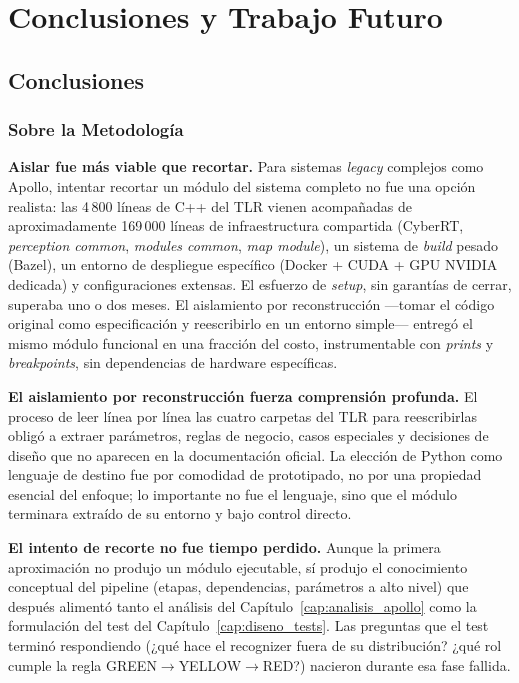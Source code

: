 \chapter{Conclusiones y Trabajo Futuro}
\label{cap:conclusiones}

\section{Conclusiones}

\subsection{Sobre la Metodología}

\textbf{Aislar fue más viable que recortar.} Para sistemas \textit{legacy} complejos como Apollo, intentar recortar un módulo del sistema completo no fue una opción realista: las 4\,800 líneas de C++ del TLR vienen acompañadas de aproximadamente 169\,000 líneas de infraestructura compartida (CyberRT, \textit{perception common}, \textit{modules common}, \textit{map module}), un sistema de \textit{build} pesado (Bazel), un entorno de despliegue específico (Docker + CUDA + GPU NVIDIA dedicada) y configuraciones extensas. El esfuerzo de \textit{setup}, sin garantías de cerrar, superaba uno o dos meses. El aislamiento por reconstrucción ---tomar el código original como especificación y reescribirlo en un entorno simple--- entregó el mismo módulo funcional en una fracción del costo, instrumentable con \textit{prints} y \textit{breakpoints}, sin dependencias de hardware específicas.

\textbf{El aislamiento por reconstrucción fuerza comprensión profunda.} El proceso de leer línea por línea las cuatro carpetas del TLR para reescribirlas obligó a extraer parámetros, reglas de negocio, casos especiales y decisiones de diseño que no aparecen en la documentación oficial. La elección de Python como lenguaje de destino fue por comodidad de prototipado, no por una propiedad esencial del enfoque; lo importante no fue el lenguaje, sino que el módulo terminara extraído de su entorno y bajo control directo.

\textbf{El intento de recorte no fue tiempo perdido.} Aunque la primera aproximación no produjo un módulo ejecutable, sí produjo el conocimiento conceptual del pipeline (etapas, dependencias, parámetros a alto nivel) que después alimentó tanto el análisis del Capítulo~\ref{cap:analisis_apollo} como la formulación del test del Capítulo~\ref{cap:diseno_tests}. Las preguntas que el test terminó respondiendo (¿qué hace el recognizer fuera de su distribución? ¿qué rol cumple la regla GREEN$\to$YELLOW$\to$RED?) nacieron durante esa fase fallida.

